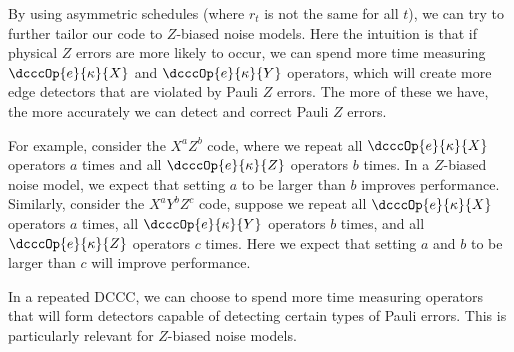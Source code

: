 By using asymmetric schedules (where $r_t$ is not the same for all $t$), we can try to further tailor our code to $Z$-biased noise models.
Here the intuition is that if physical $Z$ errors are more likely to occur, we can spend more time measuring $\dcccOp{e}{\kappa}{X}$ and $\dcccOp{e}{\kappa}{Y}$ operators, which will create more edge detectors that are violated by Pauli $Z$ errors.
The more of these we have, the more accurately we can detect and correct Pauli $Z$ errors.

For example, consider the $X^a Z^b$ code, where we repeat all $\dcccOp{e}{\kappa}{X}$ operators $a$ times
and all $\dcccOp{e}{\kappa}{Z}$ operators $b$ times.
In a $Z$-biased noise model, we expect that setting $a$ to be larger than $b$ improves performance.
Similarly, consider the $X^a Y^b Z^c$ code, suppose we repeat all $\dcccOp{e}{\kappa}{X}$ operators $a$ times, all $\dcccOp{e}{\kappa}{Y}$ operators $b$ times, and all $\dcccOp{e}{\kappa}{Z}$ operators $c$ times.
Here we expect that setting $a$ and $b$ to be larger than $c$ will improve performance.

\begin{difference}\label{dif:repeating_asymmetric_schedule}
In a repeated DCCC, we can choose to spend more time measuring operators that will form detectors capable of detecting certain types of Pauli errors.
This is particularly relevant for $Z$-biased noise models.
\end{difference}

